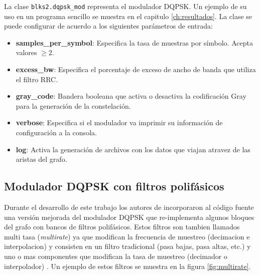 La clase \verb|blks2.dqpsk_mod| representa el modulador DQPSK. Un ejemplo de su uso en un programa sencillo se muestra en el
capitulo \ref{ch:resultados}. La clase se puede configurar de acuerdo a los siguientes par\'ametros de entrada:

\begin{itemize}
  \item \textbf{samples\_per\_symbol}: Especifica la tasa de muestras por s\'imbolo. Acepta valores $\geq 2$.
  \item \textbf{excess\_bw}: Especifica el porcentaje de exceso de ancho de banda que utiliza el filtro RRC.
  \item \textbf{gray\_code}: Bandera booleana que activa o desactiva la codificaci\'on Gray para la generaci\'on de la
  constelaci\'on.
  \item \textbf{verbose}: Especifica si el modulador va imprimir su informaci\'on de configuraci\'on a la consola.
  \item \textbf{log}: Activa la generaci\'on de archivos con los datos que viajan atravez de las aristas del grafo.
\end{itemize} 



\subsection{Modulador DQPSK con filtros polif\'asicos}
Durante el desarrollo de este trabajo los autores de \gnuradio incorporaron al c\'odigo fuente una
versi\'on mejorada del modulador DQPSK que re-implementa algunos bloques del grafo con bancos de
filtros polif\'asicos. Estos filtros son tambien llamados multi tasa (\emph{multirate}) ya que
modifican la frecuencia de muestreo (decimacion e interpolacion) y consisten en un filtro
tradicional (pasa bajas, pasa altas, etc.) y uno o mas componentes que modifican la tasa de muestreo
(decimador o interpolador) \cite{behrouz}. Un ejemplo de estos filtros se muestra en la figura \ref{fig:multirate}.

